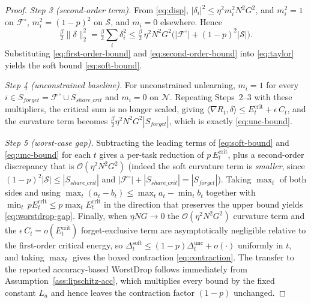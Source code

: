 \documentclass[conference]{IEEEtran}
\theoremstyle{plain}
\theoremstyle{definition}
\theoremstyle{remark}
\begin{document}
\begin{proof}
\emph{Step 3 (second-order term).}
From \eqref{eq:disp}, $|\delta_{i}|^{2}\le \eta^{2}m_{i}^{2}N^{2}G^{2}$,
and $m_{i}^{2}=1$ on $\mathcal{F}^{\!\circ}$, $m_{i}^{2}=(1-p)^{2}$ on
$\mathcal{S}$, and $m_{i}=0$ elsewhere. Hence
\begin{equation}
\label{eq:second-order-bound}
\tfrac{\beta}{2}\|\delta\|_{2}^{2}
=\tfrac{\beta}{2}\sum_{i}\delta_{i}^{2}
\le\tfrac{\beta}{2}\,\eta^{2}N^{2}G^{2}
\Big(|\mathcal{F}^{\!\circ}|+(1-p)^{2}|\mathcal{S}|\Big).
\end{equation}
Substituting \eqref{eq:first-order-bound} and
\eqref{eq:second-order-bound} into \eqref{eq:taylor} yields the soft
bound \eqref{eq:soft-bound}.

\emph{Step 4 (unconstrained baseline).}
For unconstrained unlearning, $m_{i}=1$ for every
$i\in S_{forget}=\mathcal{F}^{\!\circ}\cup S_{share\_crit}$ and
$m_{i}=0$ on $\mathcal{N}$. Repeating Steps~2--3 with these
multipliers, the critical sum is no longer scaled, giving
$\langle\nabla R_{t},\delta\rangle\le E^{\mathrm{crit}}_{t}+\epsilon\,C_{t}$,
and the curvature term becomes
$\tfrac{\beta}{2}\eta^{2}N^{2}G^{2}|S_{forget}|$, which is exactly
\eqref{eq:unc-bound}.

\emph{Step 5 (worst-case gap).}
Subtracting the leading terms of \eqref{eq:soft-bound} and
\eqref{eq:unc-bound} for each $t$ gives a per-task reduction of
$p\,E^{\mathrm{crit}}_{t}$, plus a second-order discrepancy that is
$\mathcal{O}(\eta^{2}N^{2}G^{2})$ (indeed the soft curvature term is
\emph{smaller}, since $(1-p)^{2}|\mathcal{S}|\le|S_{share\_crit}|$ and
$|\mathcal{F}^{\!\circ}|+|S_{share\_crit}|=|S_{forget}|$). Taking
$\max_{t}$ of both sides and using
$\max_t(a_t-b_t)\le\max_t a_t-\min_t b_t$ together with
$\min_t\,p E^{\mathrm{crit}}_t \le p\max_t E^{\mathrm{crit}}_t$ in the
direction that preserves the upper bound yields
\eqref{eq:worstdrop-gap}. Finally, when $\eta NG\to 0$ the
$\mathcal{O}(\eta^{2}N^{2}G^{2})$ curvature term and the
$\epsilon\,C_{t}=o(E^{\mathrm{crit}}_{t})$ forget-exclusive term are
asymptotically negligible relative to the first-order critical energy,
so $\Delta_{t}^{\mathrm{soft}}\le(1-p)\Delta_{t}^{\mathrm{unc}}+o(\cdot)$
uniformly in $t$, and taking $\max_t$ gives the boxed contraction
\eqref{eq:contraction}. The transfer to the reported accuracy-based
WorstDrop follows immediately from Assumption~\ref{ass:lipschitz-acc},
which multiplies every bound by the fixed constant $L_{a}$ and hence
leaves the contraction factor $(1-p)$ unchanged.
\end{proof}
\end{document}
